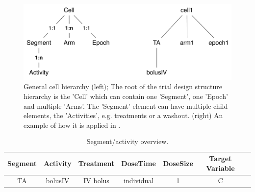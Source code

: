\begin{figure}[ht!]
\centering
\includegraphics[width=0.7\linewidth]{pics/cellHierarchy_Ribba.pdf}
\caption{General cell hierarchy (left); The root of the trial design structure hierarchy is the 'Cell' which can contain one 'Segment',
one 'Epoch' and multiple 'Arms'. The 'Segment' element can have multiple child elements, the 'Activities', e.g. treatments or a washout. (right) An example of how it is applied in \cite{Ribba:2012uq}.}
\label{fig:cellHierarchy_Ribba}
\end{figure}

\begin{table}[htdp!]
\begin{center}
\begin{tabular}{ccccccc}
\hline
Segment&Activity & Treatment & DoseTime & DoseSize & Target Variable \\
\hline
TA& bolusIV &  IV bolus & individual & 1 & C \\
\hline
\end{tabular}
\end{center}
\caption{Segment/activity overview.}
\label{tab:segementActivity_Ribba}
\end{table}

